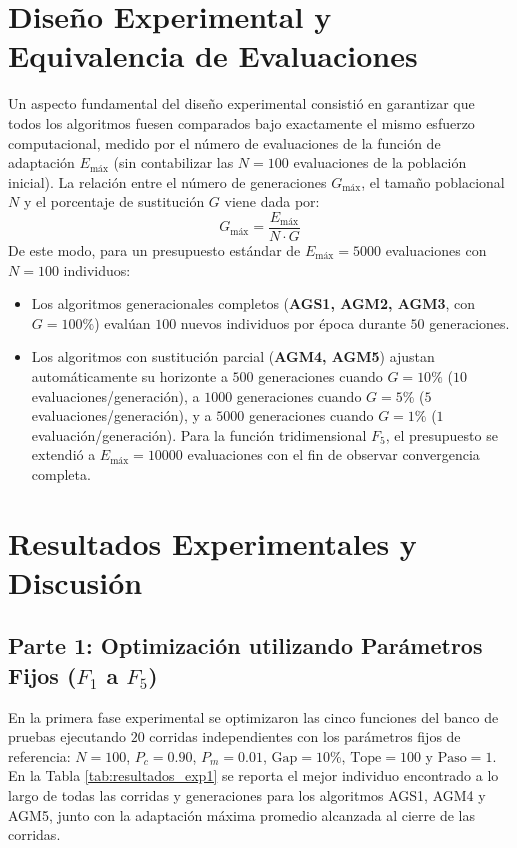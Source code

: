 \documentclass[11pt,letterpaper]{article}
\begin{document}
\section{Diseño Experimental y Equivalencia de Evaluaciones}
Un aspecto fundamental del diseño experimental consistió en garantizar que todos los algoritmos fuesen comparados bajo exactamente el mismo esfuerzo computacional, medido por el número de evaluaciones de la función de adaptación $E_{\text{máx}}$ (sin contabilizar las $N = 100$ evaluaciones de la población inicial). La relación entre el número de generaciones $G_{\text{máx}}$, el tamaño poblacional $N$ y el porcentaje de sustitución $G$ viene dada por:
\begin{equation}
    G_{\text{máx}} = \frac{E_{\text{máx}}}{N \cdot G}
    \label{eq:equivalencia_evals}
\end{equation}
De este modo, para un presupuesto estándar de $E_{\text{máx}} = 5000$ evaluaciones con $N = 100$ individuos:
\begin{itemize}
    \item Los algoritmos generacionales completos (\textbf{AGS1, AGM2, AGM3}, con $G = 100\%$) evalúan $100$ nuevos individuos por época durante $50$ generaciones.
    \item Los algoritmos con sustitución parcial (\textbf{AGM4, AGM5}) ajustan automáticamente su horizonte a $500$ generaciones cuando $G = 10\%$ ($10$ evaluaciones/generación), a $1000$ generaciones cuando $G = 5\%$ ($5$ evaluaciones/generación), y a $5000$ generaciones cuando $G = 1\%$ ($1$ evaluación/generación). Para la función tridimensional $F_5$, el presupuesto se extendió a $E_{\text{máx}} = 10000$ evaluaciones con el fin de observar convergencia completa.
\end{itemize}

\section{Resultados Experimentales y Discusión}

\subsection{Parte 1: Optimización utilizando Parámetros Fijos ($F_1$ a $F_5$)}
En la primera fase experimental se optimizaron las cinco funciones del banco de pruebas ejecutando $20$ corridas independientes con los parámetros fijos de referencia: $N = 100$, $P_c = 0.90$, $P_m = 0.01$, $\text{Gap} = 10\%$, $\text{Tope} = 100$ y $\text{Paso} = 1$. En la Tabla \ref{tab:resultados_exp1} se reporta el mejor individuo encontrado a lo largo de todas las corridas y generaciones para los algoritmos AGS1, AGM4 y AGM5, junto con la adaptación máxima promedio alcanzada al cierre de las corridas.
\end{document}
